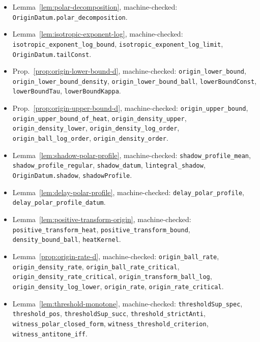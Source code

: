 {\begin{itemize}
  \texttt{separating\_family\_critical\_values}, \texttt{witness\_classA\_iff}, \texttt{criticalValues\_strictAnti}, \texttt{criticalValues\_tendsto}, \texttt{witness\_classA\_iff\_le}, \texttt{witness\_not\_classA\_of\_gt}, \texttt{criticalValues\_existsUnique\_window}, \texttt{separating\_family\_strict}.
\item Lemma~\ref{lem:polar-decomposition}, machine-checked:
  \texttt{OriginDatum.polar\_decomposition}.
\item Lemma~\ref{lem:isotropic-exponent-log}, machine-checked:
  \texttt{isotropic\_exponent\_log\_bound}, \texttt{isotropic\_exponent\_log\_limit}, \texttt{OriginDatum.tailConst}.
\item Prop.~\ref{prop:origin-lower-bound-d}, machine-checked:
  \texttt{origin\_lower\_bound}, \texttt{origin\_lower\_bound\_density}, \texttt{origin\_lower\_bound\_ball}, \texttt{lowerBoundConst}, \texttt{lowerBoundTau}, \texttt{lowerBoundKappa}.
\item Prop.~\ref{prop:origin-upper-bound-d}, machine-checked:
  \texttt{origin\_upper\_bound}, \texttt{origin\_upper\_bound\_of\_heat}, \texttt{origin\_density\_upper}, \texttt{origin\_density\_lower}, \texttt{origin\_density\_log\_order}, \texttt{origin\_ball\_log\_order}, \texttt{origin\_density\_order}.
\item Lemma~\ref{lem:shadow-polar-profile}, machine-checked:
  \texttt{shadow\_profile\_mean}, \texttt{shadow\_profile\_regular}, \texttt{shadow\_datum}, \texttt{lintegral\_shadow}, \texttt{OriginDatum.shadow}, \texttt{shadowProfile}.
\item Lemma~\ref{lem:delay-polar-profile}, machine-checked:
  \texttt{delay\_polar\_profile}, \texttt{delay\_polar\_profile\_datum}.
\item Lemma~\ref{lem:positive-transform-origin}, machine-checked:
  \texttt{positive\_transform\_heat}, \texttt{positive\_transform\_bound}, \texttt{density\_bound\_ball}, \texttt{heatKernel}.
\item Lemma~\ref{prop:origin-rate-d}, machine-checked:
  \texttt{origin\_ball\_rate}, \texttt{origin\_density\_rate}, \texttt{origin\_ball\_rate\_critical}, \texttt{origin\_density\_rate\_critical}, \texttt{origin\_transform\_ball\_log}, \texttt{origin\_density\_log\_lower}, \texttt{origin\_rate}, \texttt{origin\_rate\_critical}.
\item Lemma~\ref{lem:threshold-monotone}, machine-checked:
  \texttt{thresholdSup\_spec}, \texttt{threshold\_pos}, \texttt{thresholdSup\_succ}, \texttt{threshold\_strictAnti}, \texttt{witness\_polar\_closed\_form}, \texttt{witness\_threshold\_criterion}, \texttt{witness\_antitone\_iff}.

\end{itemize}}
